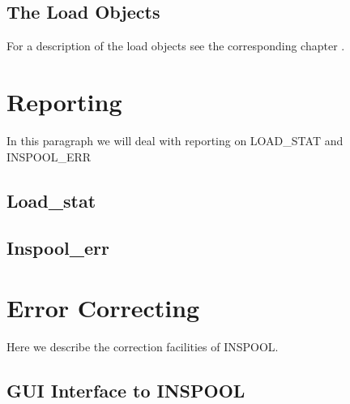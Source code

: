 \subsection{The Load Objects}

For a description of the load objects see the corresponding chapter%
.


\section{Reporting}

In this paragraph we will deal with reporting on LOAD\_STAT and INSPOOL\_ERR


\subsection{Load\_stat}


\subsection{Inspool\_err}


\section{Error Correcting}

Here we describe the correction facilities of INSPOOL.


\subsection{GUI Interface to INSPOOL}


